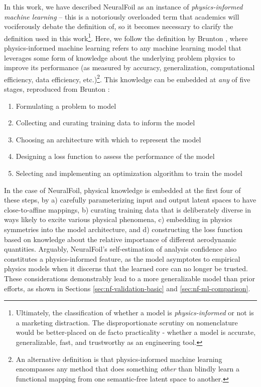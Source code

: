 In this work, we have described NeuralFoil as an instance of \emph{physics-informed machine learning} -- this is a notoriously overloaded term that academics will vociferously debate the definition of, so it becomes necessary to clarify the definition used in this work\footnote{Ultimately, the classification of whether a model is \emph{physics-informed} or not is a marketing distraction. The disproportionate scrutiny on nomenclature would be better-placed on de facto practicality - whether a model is accurate, generalizable, fast, and trustworthy as an engineering tool.}. Here, we follow the definition by Brunton \cite{brunton_data_2017, brunton_youtube_piml}, where physics-informed machine learning refers to any machine learning model that leverages some form of knowledge about the underlying problem physics to improve its performance (as measured by accuracy, generalization, computational efficiency, data efficiency, etc.)\footnote{An alternative definition is that physics-informed machine learning encompasses any method that does something \emph{other} than blindly learn a functional mapping from one semantic-free latent space to another.}. This knowledge can be embedded at \emph{any} of five stages, reproduced from Brunton \cite{brunton_youtube_piml}:
\begin{enumerate}[noitemsep]
    \item Formulating a problem to model
    \item Collecting and curating training data to inform the model
    \item Choosing an architecture with which to represent the model
    \item Designing a loss function to assess the performance of the model
    \item Selecting and implementing an optimization algorithm to train the model
\end{enumerate}

\noindent In the case of NeuralFoil, physical knowledge is embedded at the first four of these steps, by a) carefully parameterizing input and output latent spaces to have close-to-affine mappings, b) curating training data that is deliberately diverse in ways likely to excite various physical phenomena, c) embedding in physics symmetries into the model architecture, and d) constructing the loss function based on knowledge about the relative importance of different aerodynamic quantities. Arguably, NeuralFoil's self-estimation of analysis confidence also constitutes a physics-informed feature, as the model asymptotes to empirical physics models when it discerns that the learned core can no longer be trusted. These considerations demonstrably lead to a more generalizable model than prior efforts, as shown in Sections \ref{sec:nf-validation-basic} and \ref{sec:nf-ml-comparison}.

